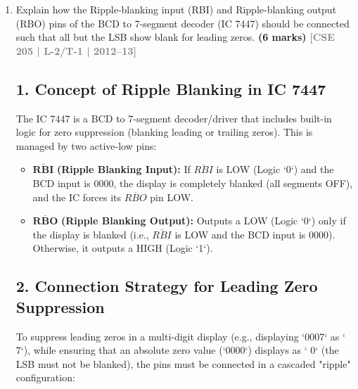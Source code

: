 \documentclass[12pt,a3paper]{article}
\newcommand{\yr}[1]{\hfill\textcolor{gray}{\small\textbf{[#1]}}}
\newcommand{\mk}[1]{\textcolor{orange!70!black}{\small\textbf{(#1 marks)}}}
\begin{document}
\begin{enumerate}

\item Explain how the Ripple-blanking input (RBI) and Ripple-blanking output (RBO) pins of the BCD to 7-segment decoder (IC 7447) should be connected such that all but the LSB show blank for leading zeros.
\mk{6} \yr{CSE 205 | L-2/T-1 | 2012--13}

\begin{tcolorbox}[enhanced,breakable,ansbox,colback=cD!4,colframe=cD,boxrule=0.8pt,arc=5pt,title={\textbf{Answer}},fonttitle=\bfseries\color{white},colbacktitle=cD]

\subsection*{1. Concept of Ripple Blanking in IC 7447}
The IC 7447 is a BCD to 7-segment decoder/driver that includes built-in logic for zero suppression (blanking leading or trailing zeros). This is managed by two active-low pins:
\begin{itemize}
    \item $\mathbf{\overline{RBI}}$ \textbf{(Ripple Blanking Input):} If $\overline{RBI}$ is LOW (Logic `0`) and the BCD input is $0000$, the display is completely blanked (all segments OFF), and the IC forces its $\overline{RBO}$ pin LOW.
    \item $\mathbf{\overline{RBO}}$ \textbf{(Ripple Blanking Output):} Outputs a LOW (Logic `0`) only if the display is blanked (i.e., $\overline{RBI}$ is LOW and the BCD input is $0000$). Otherwise, it outputs a HIGH (Logic `1`).
\end{itemize}

\subsection*{2. Connection Strategy for Leading Zero Suppression}
To suppress leading zeros in a multi-digit display (e.g., displaying `0007` as `   7`), while ensuring that an absolute zero value (`0000`) displays as `   0` (the LSB must not be blanked), the pins must be connected in a cascaded "ripple" configuration:


\end{tcolorbox}
\end{enumerate}
\end{document}
